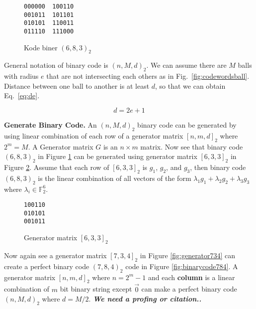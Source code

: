 \documentclass{TTP_DSL2006}
\renewcommand{\vec}{\overrightarrow}
\begin{document}
\begin{figure}
\centering
\begin{BVerbatim}
000000  100110
001011  101101
010101  110011
011110  111000
\end{BVerbatim}
\caption{Kode biner $(6,8,3)_2$}
\label{fig:binarycode683}
\end{figure}


General notation of binary code is $(n,M,d)_2$. We can assume there are $M$ balls with radius $e$ that are not intersecting each others as in Fig.~\ref{fig:codewordsball}. Distance between one ball to another is at least $d$, so that we can obtain Eq.~\ref{eq:de}.

\begin{equation} \label{eq:de}
d = 2e + 1
\end{equation}


\noindent \textbf{Generate Binary Code.}
An $(n,M,d)_2$ binary code can be generated by using linear combination of each row of a generator matrix $[n,m,d]_2$ where $2^m = M$. A Generator matrix $G$ is an $n \times m$ matrix. Now see that binary code $(6,8,3)_2$ in Figure \ref{fig:binarycode683} can be generated using generator matrix $[6,3,3]_2$ in Figure \ref{fig:generator633}. Assume that each row of $[6,3,3]_2$ is $g_1$, $g_2$, and $g_3$, then binary code $(6,8,3)_2$ is the linear combination of all vectors of the form ${\lambda}_1 g_1 + {\lambda}_2 g_2 + {\lambda}_3 g_3$ where $\lambda{_i} \in \mathbb{F}_2^6$.

\begin{figure}
\centering
\begin{BVerbatim}
100110
010101
001011
\end{BVerbatim}
\caption{Generator matrix $[6,3,3]_2$}
\label{fig:generator633}
\end{figure}

Now again see a generator matrix $[7,3,4]_2$ in Figure \ref{fig:generator734} can create a perfect binary code $(7,8,4)_2$ code in Figure \ref{fig:binarycode784}. A generator matrix $[n, m, d]_2$ where $n = 2^m - 1$ and each \textbf{column} is a linear combination of $m$ bit binary string except $\vec{0}$ can make a perfect binary code $(n,M,d)_2$ where $d = M/2$.
\textbf{\textit{We need a profing or citation..}}
\end{document}
